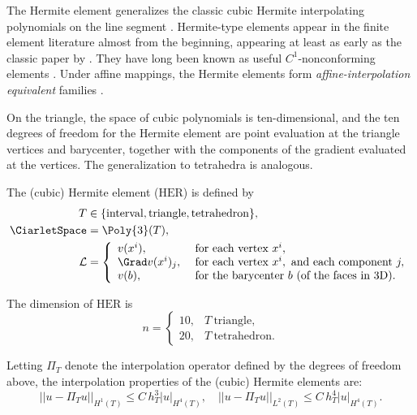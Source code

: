 The Hermite element generalizes the classic cubic Hermite
interpolating polynomials on the line segment
\citep{Ciarlet2002}. Hermite-type elements appear in the finite
element literature almost from the beginning, appearing at least as
early as the classic paper by \citet{CiarletRaviart1972}. They have
long been known as useful $C^1$-nonconforming elements
\citep{Braess2007,Ciarlet2002}.  Under affine mappings, the Hermite
elements form \emph{affine-interpolation equivalent} families
\citep{BrennerScott2008}.

On the triangle, the space of cubic polynomials is ten-dimensional,
and the ten degrees of freedom for the Hermite element are point
evaluation at the triangle vertices and barycenter, together with the
components of the gradient evaluated at the vertices. The
generalization to tetrahedra is analogous.
\begin{definition}
  The (cubic) Hermite element ($\mathrm{HER}$) is defined by
  \begin{align}
    T &\in \{ \mathrm{interval}{}, \mathrm{triangle}{}, \mathrm{tetrahedron}{}\}, \\
    \CiarletSpace &= \Poly{3}(T), \\
    \mathcal{L} &=
    \left \{
    \begin{array}{ll}
      v(x^i),
      &\text{ for each vertex } x^i, \\
      \Grad v(x^i)_j,
      &\text{ for each vertex } x^i, \text{ and each component } j, \\
      v(b),
      &\text{ for the barycenter $b$ (of the faces in 3D). }
    \end{array}
    \right.
  \end{align}
\end{definition}
The dimension of $\mathrm{HER}$ is
\begin{equation}
  n = \left \{
    \begin{array}{ll}
      10, & T~\mathrm{triangle}, \\
      20, & T~\mathrm{tetrahedron}.
    \end{array}
    \right.
\end{equation}

Letting $\Pi_T$ denote the interpolation operator defined by the
degrees of freedom above, the interpolation properties of the (cubic)
Hermite elements are:
\begin{equation}
  ||u - \Pi_T u||_{H^1(T)} \leqslant C \, h_T^{3} |u|_{H^4(T)}, \quad
  ||u - \Pi_T u||_{L^2(T)} \leqslant C \, h_T^{4} |u|_{H^4(T)}.
\end{equation}


